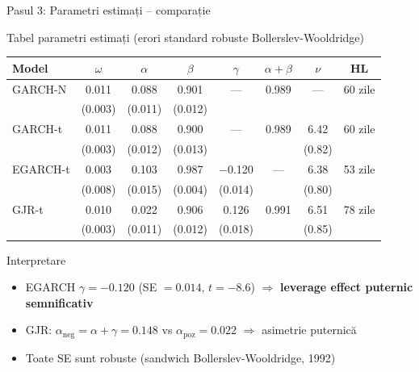 \documentclass[9pt, aspectratio=169, t]{beamer}
\begin{document}
\begin{frame}{Pasul 3: Parametri estimați -- comparație}
    \small
    \vspace{-0.2cm}
        \begin{block}{Tabel parametri estimați (erori standard robuste Bollerslev-Wooldridge)}
            \begin{center}
            \begin{tabular}{lccccccc}
                \toprule
                \textbf{Model} & $\omega$ & $\alpha$ & $\beta$ & $\gamma$ & $\alpha\!+\!\beta$ & $\nu$ & \textbf{HL} \\
                \midrule
                GARCH-N & 0.011 & 0.088 & 0.901 & --- & 0.989 & --- & 60 zile \\
                         & \tiny{(0.003)} & \tiny{(0.011)} & \tiny{(0.012)} & & & & \\
                GARCH-t & 0.011 & 0.088 & 0.900 & --- & 0.989 & 6.42 & 60 zile \\
                         & \tiny{(0.003)} & \tiny{(0.012)} & \tiny{(0.013)} & & & \tiny{(0.82)} & \\
                EGARCH-t & 0.003 & 0.103 & 0.987 & $-$0.120 & --- & 6.38 & 53 zile \\
                          & \tiny{(0.008)} & \tiny{(0.015)} & \tiny{(0.004)} & \tiny{(0.014)} & & \tiny{(0.80)} & \\
                GJR-t & 0.010 & 0.022 & 0.906 & 0.126 & 0.991 & 6.51 & 78 zile \\
                       & \tiny{(0.003)} & \tiny{(0.011)} & \tiny{(0.012)} & \tiny{(0.018)} & & \tiny{(0.85)} & \\
                \bottomrule
            \end{tabular}
            \end{center}
        \end{block}
        \vspace{-0.1cm}
        \begin{alertblock}{Interpretare}
            \begin{itemize}
                \item EGARCH $\gamma = -0.120$ (SE $= 0.014$, $t = -8.6$) $\Rightarrow$ \textbf{leverage effect puternic semnificativ}
                \item GJR: $\alpha_{\text{neg}} = \alpha + \gamma = 0.148$ vs $\alpha_{\text{poz}} = 0.022$ $\Rightarrow$ asimetrie puternică
                \item Toate SE sunt robuste (sandwich Bollerslev-Wooldridge, 1992)
            \end{itemize}
        \end{alertblock}
\end{frame}
\end{document}
